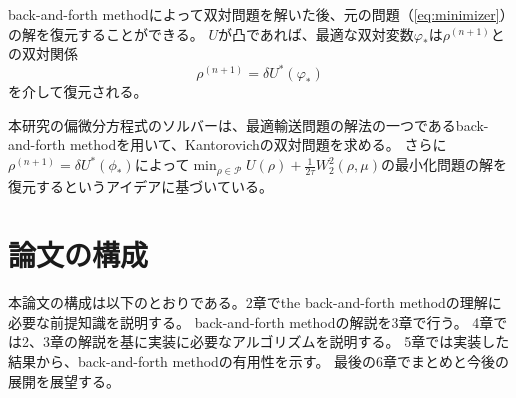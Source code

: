 back-and-forth methodによって双対問題を解いた後、元の問題（\ref{eq:minimizer}）の解を復元することができる。
$U$が凸であれば、最適な双対変数$\varphi_*$は$\rho^{(n+1)}$との双対関係
$$
    \rho^{(n+1)} = \delta U^*(\varphi_*)
$$
を介して復元される。

本研究の偏微分方程式のソルバーは、最適輸送問題の解法の一つであるback-and-forth methodを用いて、Kantorovichの双対問題を求める。
さらに$\rho^{(n+1)} = \delta U^*(\phi_*)$によって$\min_{\rho \in \mathcal{P}} U(\rho) + \frac{1}{2\tau} W_2^2(\rho, \mu)$の最小化問題の解を復元するというアイデアに基づいている。

\section{論文の構成}
\label{sect:論文の構成}
本論文の構成は以下のとおりである。2章でthe back-and-forth methodの理解に必要な前提知識を説明する。
back-and-forth methodの解説を3章で行う。
4章では2、3章の解説を基に実装に必要なアルゴリズムを説明する。
5章では実装した結果から、back-and-forth methodの有用性を示す。
最後の6章でまとめと今後の展開を展望する。